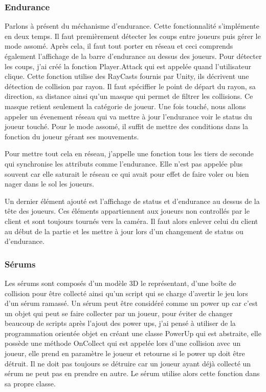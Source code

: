 \documentclass{article}
\begin{document}
\subsubsection{Endurance}

Parlons à présent du méchanisme d'endurance.
Cette fonctionnalité s'implémente en deux temps. Il faut premièrement détecter les coups entre joueurs puis gérer le mode assomé. Après cela, il faut tout porter en réseau et ceci comprends également l'affichage de la barre d'endurance au dessus des joueurs. Pour détecter les coups, j'ai créé la fonction Player.Attack qui est appelée quand l'utilisateur clique. Cette fonction utilise des RayCasts fournis par Unity, ils décrivent une détection de collision par rayon. Il faut spéciffier le point de départ du rayon, sa direction, sa distance ainsi qu'un masque qui permet de filtrer les collisions. Ce masque retient seulement la catégorie de joueur. Une fois touché, nous allons appeler un évenement réseau qui va mettre à jour l'endurance voir le status du joueur touché.
Pour le mode assomé, il suffit de mettre des conditions dans la fonction du joueur gérant ses mouvements.

Pour mettre tout cela en réseau, j'appelle une fonction tous les tiers de seconde qui synchronise les attributs comme l'endurance.
Elle n'est pas appelée plus souvent car elle saturait le réseau ce qui avait pour effet de faire voler ou bien nager dans le sol les joueurs.

Un dernier élément ajouté est l'affichage de status et d'endurance au dessus de la tête des joueurs. Ces éléments appartiennent aux joueurs non controllés par le client et sont toujours tournés vers la caméra. Il faut alors enlever celui du client au début de la partie et les mettre à jour lors d'un changement de status ou d'endurance.

\subsubsection{Sérums}

Les sérums sont composés d'un modèle 3D le représentant, d'une boîte de collision pour être collecté ainsi qu'un script qui se charge d'avertir le jeu lors d'un sérum ramassé.
Un sérum peut être considéré comme un power up car c'est un objet qui peut se faire collecter par un joueur, pour éviter de changer beaucoup de scripts après l'ajout des power ups, j'ai pensé à utiliser de la programmation orientée objet en créant une classe PowerUp qui est abstraite, elle possède une méthode OnCollect qui est appelée lors d'une collision avec un joueur, elle prend en paramètre le joueur et retourne si le power up doit être détruit. Il ne doit pas toujours se détruire car un joueur ayant déjà collecté un sérum ne peut pas en prendre en autre. Le sérum utilise alors cette fonction dans sa propre classe.
\end{document}
